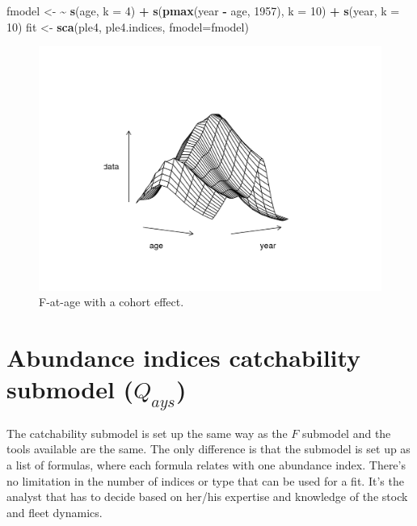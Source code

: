 \documentclass[
]{book}
\newenvironment{Shaded}{\begin{snugshade}}{\end{snugshade}}
\newcommand{\AttributeTok}[1]{\textcolor[rgb]{0.13,0.29,0.53}{#1}}
\newcommand{\DecValTok}[1]{\textcolor[rgb]{0.00,0.00,0.81}{#1}}
\newcommand{\ErrorTok}[1]{\textcolor[rgb]{0.64,0.00,0.00}{\textbf{#1}}}
\newcommand{\FunctionTok}[1]{\textcolor[rgb]{0.13,0.29,0.53}{\textbf{#1}}}
\newcommand{\NormalTok}[1]{#1}
\newcommand{\OtherTok}[1]{\textcolor[rgb]{0.56,0.35,0.01}{#1}}
\newcommand{\SpecialCharTok}[1]{\textcolor[rgb]{0.81,0.36,0.00}{\textbf{#1}}}
\begin{document}
\begin{Shaded}
\begin{Highlighting}[]
\NormalTok{fmodel }\OtherTok{\textless{}{-}} \ErrorTok{\textasciitilde{}} \FunctionTok{s}\NormalTok{(age, }\AttributeTok{k =} \DecValTok{4}\NormalTok{) }\SpecialCharTok{+} \FunctionTok{s}\NormalTok{(}\FunctionTok{pmax}\NormalTok{(year }\SpecialCharTok{{-}}\NormalTok{ age, }\DecValTok{1957}\NormalTok{), }\AttributeTok{k =} \DecValTok{10}\NormalTok{) }\SpecialCharTok{+} \FunctionTok{s}\NormalTok{(year, }\AttributeTok{k =} \DecValTok{10}\NormalTok{)}
\NormalTok{fit }\OtherTok{\textless{}{-}} \FunctionTok{sca}\NormalTok{(ple4, ple4.indices, }\AttributeTok{fmodel=}\NormalTok{fmodel)}
\end{Highlighting}
\end{Shaded}

\begin{figure}
\centering
\includegraphics{_bookdown_files/_main_files/figure-html/coh-1.png}
\caption{\label{fig:coh}F-at-age with a cohort effect.}
\end{figure}

\hypertarget{abundance-indices-catchability-submodel-q_ays}{%
\section{\texorpdfstring{Abundance indices catchability submodel (\(Q_{ays}\))}{Abundance indices catchability submodel (Q\_\{ays\})}}\label{abundance-indices-catchability-submodel-q_ays}}

The catchability submodel is set up the same way as the \(F\) submodel and the tools available are the same. The only difference is that the submodel is set up as a list of formulas, where each formula relates with one abundance index. There's no limitation in the number of indices or type that can be used for a fit. It's the analyst that has to decide based on her/his expertise and knowledge of the stock and fleet dynamics.
\end{document}

